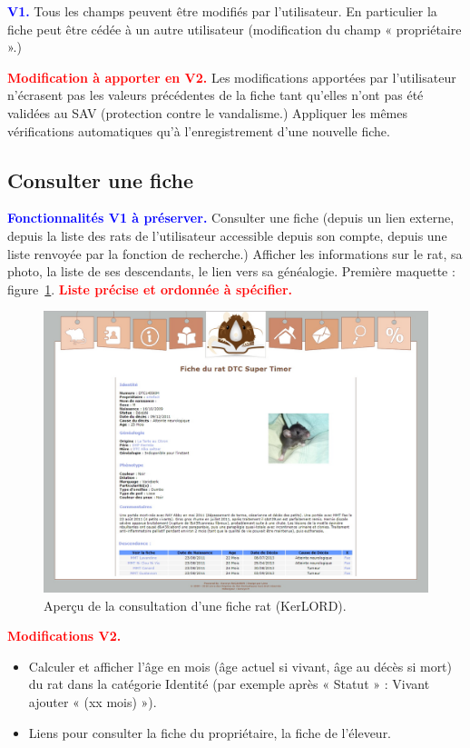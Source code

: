 \documentclass[a4paper,10pt]{article}
\newcommand\existant[1]{\noindent\textbf{\textcolor{blue}{#1}}}
\newcommand\desire[1]{\noindent\textbf{\textcolor{red}{#1}}}
\begin{document}
\existant{V1.} Tous les champs peuvent être modifiés par l'utilisateur. En particulier la fiche peut être cédée à un autre utilisateur (modification du champ « propriétaire ».)  

\desire{Modification à apporter en V2.} Les modifications apportées par l'utilisateur n'écrasent pas les valeurs précédentes de la fiche tant qu'elles n'ont pas été validées au SAV (protection contre le vandalisme.) Appliquer les mêmes vérifications automatiques qu'à l'enregistrement d'une nouvelle fiche.

\subsection{Consulter une fiche}
\existant{Fonctionnalités V1 à préserver.}
Consulter une fiche (depuis un lien externe, depuis la liste des rats de l'utilisateur accessible depuis son compte, depuis une liste renvoyée par la fonction de recherche.) Afficher les informations sur le rat, sa photo, la liste de ses descendants, le lien vers sa généalogie. Première maquette : figure~\ref{fig:kerfiche}. \desire{Liste précise et ordonnée à spécifier.}

\begin{figure}[htbp!]
\begin{center}\includegraphics[width=0.8\linewidth]{FicheRat.jpg}\end{center}
\caption{Aperçu de la consultation d'une fiche rat (KerLORD).\label{fig:kerfiche}}
\end{figure}

\desire{Modifications V2.}
\begin{itemize}
\item Calculer et afficher l'âge en mois (âge actuel si vivant, âge au décès si mort) du rat dans la catégorie Identité (par exemple après « Statut » : Vivant ajouter « (xx mois) »).  
\item Liens pour consulter la fiche du propriétaire, la fiche de l'éleveur.
\end{itemize}
\end{document}
